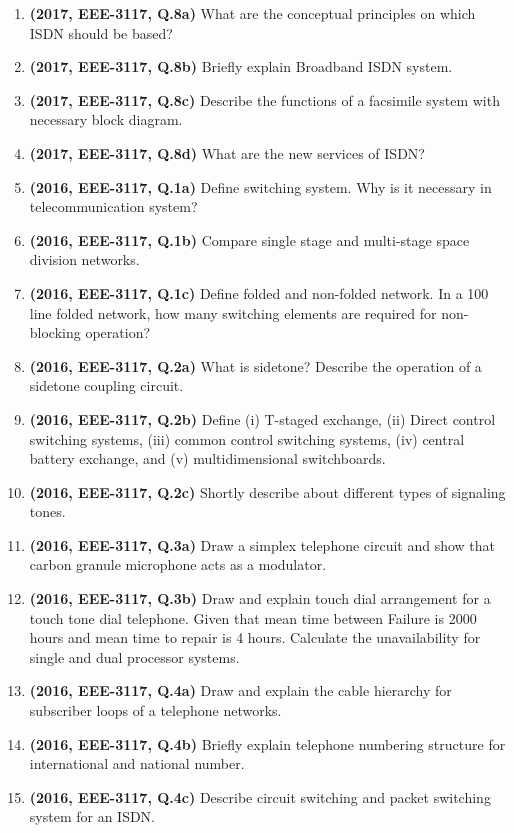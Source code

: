 \documentclass[12pt, a4paper]{article}
\begin{document}
\begin{enumerate}
		\item \textbf{(2017, EEE-3117, Q.8a)} What are the conceptual principles on which ISDN should be based?
		\item \textbf{(2017, EEE-3117, Q.8b)} Briefly explain Broadband ISDN system.
		\item \textbf{(2017, EEE-3117, Q.8c)} Describe the functions of a facsimile system with necessary block diagram.
		\item \textbf{(2017, EEE-3117, Q.8d)} What are the new services of ISDN?
		
		\item \textbf{(2016, EEE-3117, Q.1a)} Define switching system. Why is it necessary in telecommunication system?
		\item \textbf{(2016, EEE-3117, Q.1b)} Compare single stage and multi-stage space division networks.
		\item \textbf{(2016, EEE-3117, Q.1c)} Define folded and non-folded network. In a 100 line folded network, how many switching elements are required for non-blocking operation?
		\item \textbf{(2016, EEE-3117, Q.2a)} What is sidetone? Describe the operation of a sidetone coupling circuit.
		\item \textbf{(2016, EEE-3117, Q.2b)} Define (i) T-staged exchange, (ii) Direct control switching systems, (iii) common control switching systems, (iv) central battery exchange, and (v) multidimensional switchboards.
		\item \textbf{(2016, EEE-3117, Q.2c)} Shortly describe about different types of signaling tones.
		\item \textbf{(2016, EEE-3117, Q.3a)} Draw a simplex telephone circuit and show that carbon granule microphone acts as a modulator.
		\item \textbf{(2016, EEE-3117, Q.3b)} Draw and explain touch dial arrangement for a touch tone dial telephone. Given that mean time between Failure is 2000 hours and mean time to repair is 4 hours. Calculate the unavailability for single and dual processor systems.
		\item \textbf{(2016, EEE-3117, Q.4a)} Draw and explain the cable hierarchy for subscriber loops of a telephone networks.
		\item \textbf{(2016, EEE-3117, Q.4b)} Briefly explain telephone numbering structure for international and national number.
		\item \textbf{(2016, EEE-3117, Q.4c)} Describe circuit switching and packet switching system for an ISDN.

\end{enumerate}
\end{document}
